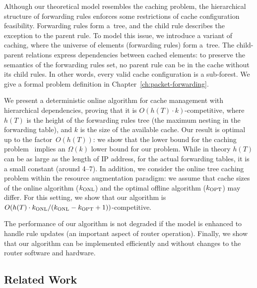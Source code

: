 Although our theoretical model resembles the caching problem, the hierarchical structure of forwarding rules enforces some restrictions of cache configuration feasibility.
Forwarding rules form a~tree, and the child rule describes the exception to the parent rule.
To model this issue, we introduce a variant of caching, where the universe of elements (forwarding rules) form a~tree.
The child-parent relations express dependencies between cached elements: to preserve the semantics of the forwarding rules set, no parent rule can be in the cache without its child rules.
In other words, every valid cache configuration is a sub-forest.
We give a formal problem definition in Chapter~\ref{ch:packet-forwarding}.


We present a deterministic online algorithm for cache management with hierarchical dependencies, proving that it is
$O(h(T)\cdot k)$-competitive, where $h(T)$ is the height of the forwarding rules tree (the maximum nesting in the forwarding table), and $k$ is the size of the available cache.
Our result is optimal up to the factor~$O(h(T))$: we show that the lower
bound for the caching problem~\cite{SleTar85} implies an
$\Omega(k)$ lower bound for our problem.
While in theory $h(T)$ can be as large as the length of IP address, for the actual forwarding tables, it is a small constant (around 4--7).
In addition, we consider the online tree caching problem within the resource
augmentation paradigm: we assume that cache sizes of the online algorithm
($k_\textnormal{ONL}$)  and the optimal offline algorithm ($k_\textnormal{OPT}$) may differ.
For this setting, we show that our algorithm is
$O(h(T) \cdot k_\textnormal{ONL}/(k_\textnormal{ONL}-k_\textnormal{OPT}+1))$-competitive.


The performance of our algorithm is not degraded if the model is enhanced to handle rule updates (an important aspect of router operation).
Finally, we show that our algorithm can be implemented efficiently and without changes to the router software and hardware.

\subsection{Related Work}

